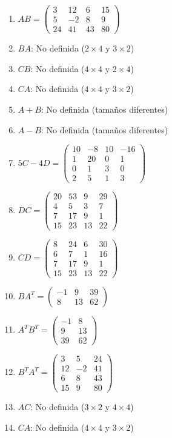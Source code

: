 \begin{prob}
\begin{myproof}
\begin{multicols}{2}
\begin{enumerate}[$(a)$]
    \item $AB = \begin{pmatrix} 3 & 12 & 6 & 15 \\ 5 & -2 & 8 & 9 \\ 24 & 41 & 43 & 80 \end{pmatrix}$
    \item $BA$: No definida ($2 \times 4$ y $3 \times 2$)
    \item $CB$: No definida ($4 \times 4$ y $2 \times 4$)
    \item $CA$: No definida ($4 \times 4$ y $3 \times 2$)
    \item $A + B$: No definida (tamaños diferentes)
    \item $A - B$: No definida (tamaños diferentes)
    \item $5C - 4D = \begin{pmatrix} 10 & -8 & 10 & -16 \\ 1 & 20 & 0 & 1 \\ 0 & 1 & 3 & 0 \\ 2 & 5 & 1 & 3 \end{pmatrix}$
    \item $DC = \begin{pmatrix} 20 & 53 & 9 & 29 \\ 4 & 5 & 3 & 7 \\ 7 & 17 & 9 & 1 \\ 15 & 23 & 13 & 22 \end{pmatrix}$
    \item $CD = \begin{pmatrix} 8 & 24 & 6 & 30 \\ 6 & 7 & 1 & 16 \\ 7 & 17 & 9 & 1 \\ 15 & 23 & 13 & 22 \end{pmatrix}$
    \item $BA^T = \begin{pmatrix} -1 & 9 & 39 \\ 8 & 13 & 62 \end{pmatrix}$
    \item $A^TB^T = \begin{pmatrix} -1 & 8 \\ 9 & 13 \\ 39 & 62 \end{pmatrix}$
    \item $B^TA^T = \begin{pmatrix} 3 & 5 & 24 \\ 12 & -2 & 41 \\ 6 & 8 & 43 \\ 15 & 9 & 80 \end{pmatrix}$
    \item $AC$: No definida ($3 \times 2$ y $4 \times 4$)
    \item $CA$: No definida ($4 \times 4$ y $3 \times 2$)
\end{enumerate}
\end{multicols}
\end{myproof}
\end{prob}

